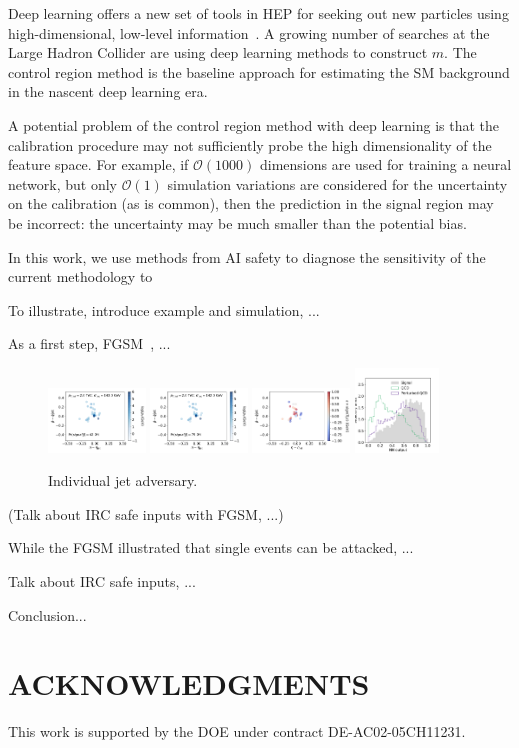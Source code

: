 \documentclass[reprint,nofootinbib,...]{revtex4-1}
\begin{document}
Deep learning offers a new set of tools in HEP for seeking out new particles using high-dimensional, low-level information~\cite{Baldi:2014kfa,Larkoski:2017jix,Radovic:2018dip,Guest:2018yhq}. A growing number of searches at the Large Hadron Collider are using deep learning methods to construct $m$. The control region method is the baseline approach for estimating the SM background in the nascent deep learning era.

A potential problem of the control region method with deep learning is that the calibration procedure may not sufficiently probe the high dimensionality of the feature space.  For example, if $\mathcal{O}(1000)$ dimensions are used for training a neural network, but only $\mathcal{O}(1)$ simulation variations are considered for the uncertainty on the calibration (as is common), then the prediction in the signal region may be incorrect: the uncertainty may be much smaller than the potential bias.

In this work, we use methods from AI safety to diagnose the sensitivity of the current methodology to 

To illustrate, introduce example and simulation, ...

As a first step, FGSM~\cite{DBLP:journals/corr/GoodfellowSS14}, ...

\begin{figure}[h!]
\centering
\includegraphics[width=0.23\textwidth]{figures/panel_1.pdf}
\includegraphics[width=0.23\textwidth]{figures/panel_2.pdf}
\includegraphics[width=0.23\textwidth]{figures/panel_3.pdf}
\includegraphics[width=0.2\textwidth]{figures/NN_FGSM.pdf}
\label{fig:FGSM}
\caption{Individual jet adversary.}
\end{figure}

(Talk about IRC safe inputs with FGSM, ...)

While the FGSM illustrated that single events can be attacked, ...

Talk about IRC safe inputs, ...

Conclusion...


\section*{ACKNOWLEDGMENTS}

This work is supported by the DOE under contract DE-AC02-05CH11231. 


\end{document}
